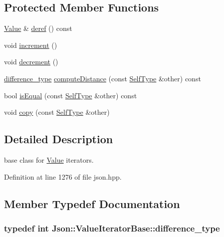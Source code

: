 \subsection*{Protected Member Functions}
\begin{DoxyCompactItemize}
\item 
\hyperlink{class_json_1_1_value}{Value} \& \hyperlink{class_json_1_1_value_iterator_base_a40a20c65abc423a26e3aae68d9a0525c}{deref} () const 
\item 
void \hyperlink{class_json_1_1_value_iterator_base_afe58f9534e1fd2033419fd9fe244551e}{increment} ()
\item 
void \hyperlink{class_json_1_1_value_iterator_base_affc8cf5ff54a9f432cc693362c153fa6}{decrement} ()
\item 
\hyperlink{class_json_1_1_value_iterator_base_a4e44bf8cbd17ec8d6e2c185904a15ebd}{difference\-\_\-type} \hyperlink{class_json_1_1_value_iterator_base_ad6c553b249e89e3dc9933e100ccbe064}{compute\-Distance} (const \hyperlink{class_json_1_1_value_iterator_base_a9d2a940d03ea06d20d972f41a89149ee}{Self\-Type} \&other) const 
\item 
bool \hyperlink{class_json_1_1_value_iterator_base_a21820d6ee564e541bd118b21e4741962}{is\-Equal} (const \hyperlink{class_json_1_1_value_iterator_base_a9d2a940d03ea06d20d972f41a89149ee}{Self\-Type} \&other) const 
\item 
void \hyperlink{class_json_1_1_value_iterator_base_a496e6aba44808433ec5858c178be5719}{copy} (const \hyperlink{class_json_1_1_value_iterator_base_a9d2a940d03ea06d20d972f41a89149ee}{Self\-Type} \&other)
\end{DoxyCompactItemize}


\subsection{Detailed Description}
base class for \hyperlink{class_json_1_1_value}{Value} iterators. 



Definition at line 1276 of file json.\-hpp.



\subsection{Member Typedef Documentation}
\hypertarget{class_json_1_1_value_iterator_base_a4e44bf8cbd17ec8d6e2c185904a15ebd}{
\subsubsection[{difference\-\_\-type}]{\setlength{\rightskip}{0pt plus 5cm}typedef int {\bf Json\-::\-Value\-Iterator\-Base\-::difference\-\_\-type}}}\label{class_json_1_1_value_iterator_base_a4e44bf8cbd17ec8d6e2c185904a15ebd}


